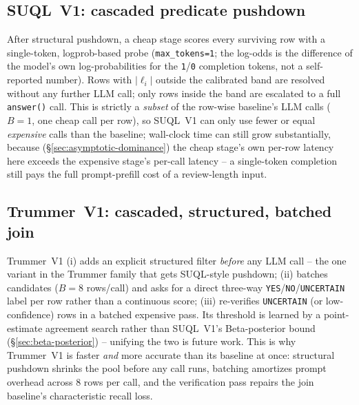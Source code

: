 \documentclass[sigconf,natbib=false]{acmart}
\begin{document}
\subsection{SUQL~V1: cascaded predicate pushdown}
After structural pushdown, a cheap stage scores every surviving row with a single-token, logprob-based probe (\texttt{max\_tokens=1}; the log-odds is the difference of the model's own log-probabilities for the \texttt{1}/\texttt{0} completion tokens, not a self-reported number). Rows with $|\ell_i|$ outside the calibrated band are resolved without any further LLM call; only rows inside the band are escalated to a full \texttt{answer()} call. This is strictly a \emph{subset} of the row-wise baseline's LLM calls ($B{=}1$, one cheap call per row), so SUQL~V1 can only use fewer or equal \emph{expensive} calls than the baseline; wall-clock time can still grow substantially, because (\S\ref{sec:asymptotic-dominance}) the cheap stage's own per-row latency here exceeds the expensive stage's per-call latency -- a single-token completion still pays the full prompt-prefill cost of a review-length input.

\subsection{Trummer~V1: cascaded, structured, batched join}
\label{sec:trummer-v1}
Trummer~V1 (i) adds an explicit structured filter \emph{before} any LLM call -- the one variant in the Trummer family that gets SUQL-style pushdown; (ii) batches candidates ($B{=}8$ rows/call) and asks for a direct three-way \texttt{YES}/\texttt{NO}/\texttt{UNCERTAIN} label per row rather than a continuous score; (iii) re-verifies \texttt{UNCERTAIN} (or low-confidence) rows in a batched expensive pass. Its threshold is learned by a point-estimate agreement search rather than SUQL~V1's Beta-posterior bound (\S\ref{sec:beta-posterior}) -- unifying the two is future work. This is why Trummer~V1 is faster \emph{and} more accurate than its baseline at once: structural pushdown shrinks the pool before any call runs, batching amortizes prompt overhead across $8$ rows per call, and the verification pass repairs the join baseline's characteristic recall loss.
\end{document}

